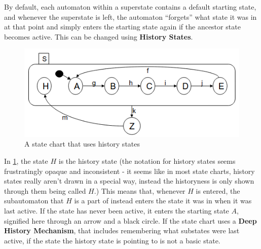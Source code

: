 \documentclass{report}
\newcommand{\tbf}{\textbf}
\newcommand*{\newpar}{\par\vspace{\baselineskip}\noindent} %
\begin{document}
\newpar
By default, each automaton within a superstate contains a default starting state, and whenever the superstate is left, the automaton ``forgets'' what state it was in at that point and simply enters the starting state again if the ancestor state becomes active. This can be changed using \tbf{History States}.
\begin{figure}[h!]
\centering
\includegraphics[scale=0.8]{figures/history}
\caption{A state chart that uses history states}
\label{fig:history}
\end{figure}
\newpar
In \ref{fig:history}, the state $H$ is the history state (the notation for history states seems frustratingly opaque and inconsistent - it seems like in most state charts, history states really aren't drawn in a special way, instead the historyness is only shown through them being called $H$.) This means that, whenever $H$ is entered, the subautomaton that $H$ is a part of instead enters the state it was in when it was last active. If the state has never been active, it enters the starting state $A$, signified here through an arrow and a black circle. If the state chart uses a \tbf{Deep History Mechanism}, that includes remembering what substates were last active, if the state the history state is pointing to is not a basic state.
%
\end{document}
